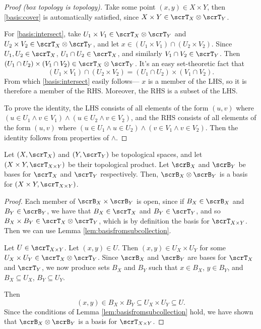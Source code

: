 \documentclass{article}
\begin{document}
\begin{proof}[Proof (box topology is topology)]
    Take some point $(x,y) \in X \times Y$, then \ref{basis:cover} is automatically satisfied, since $X \times Y \in \scrT_X \otimes \scrT_Y$.
    
    For \ref{basis:intersect}, take $U_1 \times V_1 \in \scrT_X \otimes \scrT_Y$ and $U_2 \times V_2 \in \scrT_X \otimes \scrT_Y$, and let $x \in (U_1 \times V_1) \cap (U_2 \times V_2)$.
    Since $U_1, U_2 \in \scrT_X$, $U_1 \cap U_2 \in \scrT_X$, and similarly $V_1 \cap V_2 \in \scrT_Y$.
    Then $(U_1 \cap U_2) \times (V_1 \cap V_2) \in \scrT_X \otimes \scrT_Y$.
    It's an easy set-theoretic fact that
    \[
        (U_1 \times V_1) \cap (U_2 \times V_2) = (U_1 \cap U_2) \times (V_1 \cap V_2).
    \]
    From which \ref{basis:intersect} easily follows--- $x$ is a member of the LHS, so it is therefore a member of the RHS.
    Moreover, the RHS is a subset of the LHS.

    To prove the identity, the LHS consists of all elements of the form $(u,v)$ where $(u \in U_1 \wedge v \in V_1) \wedge (u \in U_2 \wedge v \in V_2)$, and the RHS consists of all elements of the form $(u,v)$ where $(u \in U_1 \wedge u \in U_2) \wedge (v \in V_1 \wedge v \in V_2)$.
    Then the identity follows from properties of $\wedge$.
\end{proof}

\begin{theorem}\label{thm:basisforproduct}
    Let $(X, \scrT_X)$ and $(Y, \scrT_Y)$ be topological spaces, and let $(X \times Y, \scrT_{X \times Y})$ be their topological product.
    Let $\scrB_X$ and $\scrB_Y$ be bases for $\scrT_X$ and $\scrT_Y$ respectively.
    Then, $\scrB_X \otimes \scrB_Y$ is a basis for $(X \times Y, \scrT_{X \times Y})$.
\end{theorem}

\begin{proof}
    Each member of $\scrB_X \times \scrB_Y$ is open, since if $B_X \in \scrB_X$ and $B_Y \in \scrB_Y$, we have that $B_X \in \scrT_X$ and $B_Y \in \scrT_Y$, and so $B_X \times B_Y \in \scrT_X \otimes \scrT_Y$, which is by definition the basis for $\scrT_{X \times Y}$. 
    Then we can use Lemma \ref{lem:basisfromsubcollection}.

    Let $U \in \scrT_{X \times Y}$.
    Let $(x,y) \in U$.
    Then $(x,y) \in U_X \times U_Y$ for some $U_X \times U_Y \in \scrT_X \otimes \scrT_Y$. Since $\scrB_X$ and $\scrB_Y$ are bases for $\scrT_X$ and $\scrT_Y$, we now produce sets $B_X$ and $B_Y$ such that $x \in B_X$, $y \in B_Y$, and $B_X \subseteq U_X$, $B_Y \subseteq U_Y$.

    Then
    \[
        (x,y) \in B_X \times B_Y \subseteq U_X \times U_Y \subseteq U.
    \]
    Since the conditions of Lemma \ref{lem:basisfromsubcollection} hold, we have shown that $\scrB_X \otimes \scrB_Y$ is a basis for $\scrT_{X \times Y}$.
\end{proof}
\end{document}
